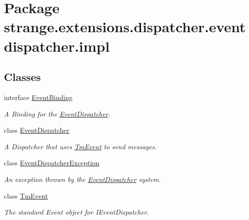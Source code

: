 \hypertarget{namespacestrange_1_1extensions_1_1dispatcher_1_1eventdispatcher_1_1impl}{\section{Package strange.\-extensions.\-dispatcher.\-eventdispatcher.\-impl}
\label{namespacestrange_1_1extensions_1_1dispatcher_1_1eventdispatcher_1_1impl}
}
\subsection*{Classes}
\begin{DoxyCompactItemize}
\item 
interface \hyperlink{classstrange_1_1extensions_1_1dispatcher_1_1eventdispatcher_1_1impl_1_1_event_binding}{Event\-Binding}
\begin{DoxyCompactList}\small\item\em A Binding for the \hyperlink{classstrange_1_1extensions_1_1dispatcher_1_1eventdispatcher_1_1impl_1_1_event_dispatcher}{Event\-Dispatcher}. \end{DoxyCompactList}\item 
class \hyperlink{classstrange_1_1extensions_1_1dispatcher_1_1eventdispatcher_1_1impl_1_1_event_dispatcher}{Event\-Dispatcher}
\begin{DoxyCompactList}\small\item\em A Dispatcher that uses \hyperlink{classstrange_1_1extensions_1_1dispatcher_1_1eventdispatcher_1_1impl_1_1_tm_event}{Tm\-Event} to send messages. \end{DoxyCompactList}\item 
class \hyperlink{classstrange_1_1extensions_1_1dispatcher_1_1eventdispatcher_1_1impl_1_1_event_dispatcher_exception}{Event\-Dispatcher\-Exception}
\begin{DoxyCompactList}\small\item\em An exception thrown by the \hyperlink{classstrange_1_1extensions_1_1dispatcher_1_1eventdispatcher_1_1impl_1_1_event_dispatcher}{Event\-Dispatcher} system. \end{DoxyCompactList}\item 
class \hyperlink{classstrange_1_1extensions_1_1dispatcher_1_1eventdispatcher_1_1impl_1_1_tm_event}{Tm\-Event}
\begin{DoxyCompactList}\small\item\em The standard Event object for I\-Event\-Dispatcher. \end{DoxyCompactList}\end{DoxyCompactItemize}
